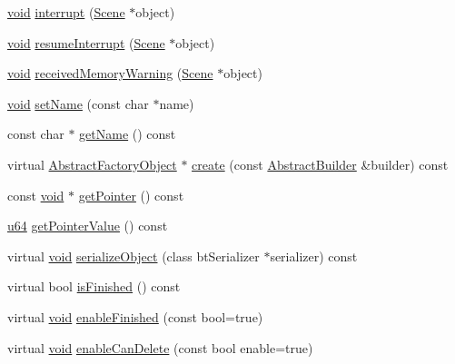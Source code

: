 \begin{DoxyCompactItemize}
\item 
\mbox{\hyperlink{_thread_8h_af1e856da2e658414cb2456cb6f7ebc66}{void}} \mbox{\hyperlink{classnjli_1_1_scene_state_a6a733557c14d69103650485b239a9fc0}{interrupt}} (\mbox{\hyperlink{classnjli_1_1_scene}{Scene}} $\ast$object)
\item 
\mbox{\hyperlink{_thread_8h_af1e856da2e658414cb2456cb6f7ebc66}{void}} \mbox{\hyperlink{classnjli_1_1_scene_state_a075ad8f0e66c93ef018ba79fdc5b31be}{resume\+Interrupt}} (\mbox{\hyperlink{classnjli_1_1_scene}{Scene}} $\ast$object)
\item 
\mbox{\hyperlink{_thread_8h_af1e856da2e658414cb2456cb6f7ebc66}{void}} \mbox{\hyperlink{classnjli_1_1_scene_state_a2284c8a48c1b17385eef0b8b150bb02b}{received\+Memory\+Warning}} (\mbox{\hyperlink{classnjli_1_1_scene}{Scene}} $\ast$object)
\item 
\mbox{\hyperlink{_thread_8h_af1e856da2e658414cb2456cb6f7ebc66}{void}} \mbox{\hyperlink{classnjli_1_1_scene_state_a087eb5f8d9f51cc476f12f1d10a3cb95}{set\+Name}} (const char $\ast$name)
\item 
const char $\ast$ \mbox{\hyperlink{classnjli_1_1_scene_state_ad41266885be835f3ee602311e20877a4}{get\+Name}} () const
\item 
virtual \mbox{\hyperlink{classnjli_1_1_abstract_factory_object}{Abstract\+Factory\+Object}} $\ast$ \mbox{\hyperlink{classnjli_1_1_scene_state_a83a8876ae63b92804004cf3febe76573}{create}} (const \mbox{\hyperlink{classnjli_1_1_abstract_builder}{Abstract\+Builder}} \&builder) const
\item 
const \mbox{\hyperlink{_thread_8h_af1e856da2e658414cb2456cb6f7ebc66}{void}} $\ast$ \mbox{\hyperlink{classnjli_1_1_scene_state_ac4ca71716ed832be357f15f8262c8448}{get\+Pointer}} () const
\item 
\mbox{\hyperlink{_util_8h_ad758b7a5c3f18ed79d2fcd23d9f16357}{u64}} \mbox{\hyperlink{classnjli_1_1_scene_state_a4ffddf141a426a5a07d0ac19f1913811}{get\+Pointer\+Value}} () const
\item 
virtual \mbox{\hyperlink{_thread_8h_af1e856da2e658414cb2456cb6f7ebc66}{void}} \mbox{\hyperlink{classnjli_1_1_scene_state_a4fc4bcd9d1930911474210c047372fc0}{serialize\+Object}} (class bt\+Serializer $\ast$serializer) const
\item 
virtual bool \mbox{\hyperlink{classnjli_1_1_scene_state_a4c7007210237496fbe169ba114c3750d}{is\+Finished}} () const
\item 
virtual \mbox{\hyperlink{_thread_8h_af1e856da2e658414cb2456cb6f7ebc66}{void}} \mbox{\hyperlink{classnjli_1_1_scene_state_aa4e66d0016cd5c43dc3a485eaf558174}{enable\+Finished}} (const bool=true)
\item 
virtual \mbox{\hyperlink{_thread_8h_af1e856da2e658414cb2456cb6f7ebc66}{void}} \mbox{\hyperlink{classnjli_1_1_scene_state_a4ed007508bd8f80af668a302376b7d1a}{enable\+Can\+Delete}} (const bool enable=true)
\end{DoxyCompactItemize}
